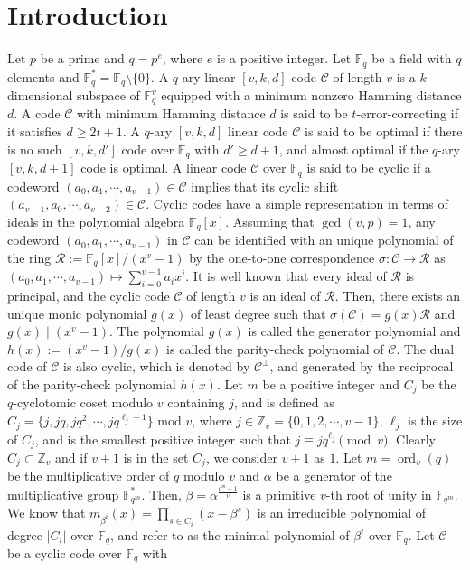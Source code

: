 \documentclass[pdflatex,sn-mathphys-num]{sn-jnl}%
\theoremstyle{thmstyleone}%
\theoremstyle{thmstyletwo}%
\theoremstyle{thmstylethree}%
\begin{document}
\maketitle

\section{Introduction}\label{sec1}
Let $p$ be a prime and $q=p^{e}$, where $e$ is a positive integer. Let $\mathbb{F}_{q}$ be a field with $q$ elements and $\mathbb{F}_{q}^{*}=\mathbb{F}_{q}\setminus\{0\}$. A $q$-ary linear $[v,k,d]$ code $\mathcal{C}$ of length $v$ is a $k$-dimensional subspace of $\mathbb{F}_{q}^{v}$ equipped with a minimum nonzero Hamming distance $d$. A code $\mathcal{C}$ with minimum Hamming distance $d$ is said to be $t$-error-correcting if it satisfies $d\geq 2t+1$. A $q$-ary $[v,k,d]$ linear code $\mathcal{C}$ is said to be optimal if there is no such $[v,k,d']$ code over $\mathbb{F}_{q}$ with $d'\geq d+1$, and almost optimal if the $q$-ary $[v,k,d+1]$ code is optimal. A linear code $\mathcal{C}$ over $\mathbb{F}_{q}$ is said to be cyclic if a codeword $(a_{0},a_{1},\cdots,a_{v-1})\in\mathcal{C}$ implies that its cyclic shift $(a_{v-1},a_{0},\cdots,a_{v-2})\in\mathcal{C}$. Cyclic codes have a simple representation in terms of ideals in the polynomial algebra $\mathbb{F}_{q}[x]$. Assuming that $\operatorname{gcd}(v,p)=1$, any codeword $(a_{0},a_{1},\cdots,a_{v-1})$ in $\mathcal{C}$ can be identified with an unique polynomial of the ring $\mathcal{R}:=\mathbb{F}_{q}[x]/(x^v-1)$ by the one-to-one correspondence $\sigma:\mathcal{C}\rightarrow\mathcal{R}$ as $(a_{0},a_{1},\cdots,a_{v-1})\mapsto\sum_{i=0}^{v-1}a_{i}x^{i}$. It is well known that every ideal of $\mathcal{R}$ is principal, and the cyclic code $\mathcal{C}$ of length $v$ is an ideal of $\mathcal{R}$. Then, there exists an unique monic polynomial $g(x)$ of least degree such that $\sigma(\mathcal{C})=g(x)\mathcal{R}$ and $g(x)\mid (x^v-1)$. The polynomial $g(x)$ is called the generator polynomial and $h(x):=(x^v-1)/g(x)$ is called the parity-check polynomial of $\mathcal{C}$. The dual code of $\mathcal{C}$ is also cyclic, which is denoted by $\mathcal{C}^{\perp}$, and generated by the reciprocal of the parity-check polynomial $h(x)$. Let $m$ be a positive integer and $C_{j}$ be the $q$-cyclotomic coset modulo $v$ containing $j$, and is defined as $C_{j}=\{j,jq,jq^2,\cdots,jq^{\ell_{j}-1}\}\text{ mod }v$, where $j\in\mathbb{Z}_{v}=\{0,1,2,\cdots,v-1\}$, $\ell_{j}$ is the size of $C_{j}$, and is the smallest positive integer such that $j\equiv jq^{\ell_{j}}\pmod{v}$. Clearly $C_{j}\subset\mathbb{Z}_{v}$ and if $v+1$ is in the set $C_{j}$, we consider $v+1$ as $1$. Let $m=\operatorname{ord}_{v}(q)$ be the multiplicative order of $q$ modulo $v$ and $\alpha$ be a generator of the multiplicative group $\mathbb{F}_{q^m}^{*}$. Then, $\beta=\alpha^{\frac{q^m-1}{v}}$ is a primitive $v$-th root of unity in $\mathbb{F}_{q^m}$. We know that $m_{\beta^{i}}(x)=\prod_{s\in C_{i}}(x-\beta^{s})$ is an irreducible polynomial of degree $|C_{i}|$ over $\mathbb{F}_{q}$, and refer to as the minimal polynomial of $\beta^{i}$ over $\mathbb{F}_{q}$. Let $\mathcal{C}$ be a cyclic code over $\mathbb{F}_{q}$ with 
\end{document}
